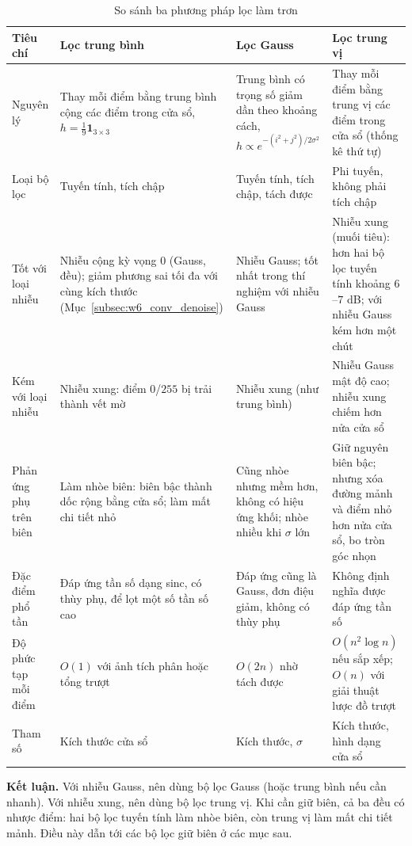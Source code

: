 \begin{table}[ht]
\centering
\scriptsize
\caption{So sánh ba phương pháp lọc làm trơn}
\label{tab:w6_three_filters}
\renewcommand{\arraystretch}{1.3}
\begin{tabularx}{\textwidth}{|p{2.2cm}|X|X|X|}
\hline
\textbf{Tiêu chí} & \textbf{Lọc trung bình} & \textbf{Lọc Gauss} & \textbf{Lọc trung vị} \\
\hline
Nguyên lý & Thay mỗi điểm bằng trung bình cộng các điểm trong cửa sổ, $h = \frac{1}{9}\mathbf{1}_{3 \times 3}$ & Trung bình có trọng số giảm dần theo khoảng cách, $h \propto e^{-(i^2 + j^2)/2\sigma^2}$ & Thay mỗi điểm bằng trung vị các điểm trong cửa sổ (thống kê thứ tự) \\
\hline
Loại bộ lọc & Tuyến tính, tích chập & Tuyến tính, tích chập, tách được & Phi tuyến, không phải tích chập \\
\hline
Tốt với loại nhiễu & Nhiễu cộng kỳ vọng $0$ (Gauss, đều); giảm phương sai tối đa với cùng kích thước (Mục~\ref{subsec:w6_conv_denoise}) & Nhiễu Gauss; tốt nhất trong thí nghiệm với nhiễu Gauss & Nhiễu xung (muối tiêu): hơn hai bộ lọc tuyến tính khoảng $6$--$7$ dB; với nhiễu Gauss kém hơn một chút \\
\hline
Kém với loại nhiễu & Nhiễu xung: điểm $0$/$255$ bị trải thành vết mờ & Nhiễu xung (như trung bình) & Nhiễu Gauss mật độ cao; nhiễu xung chiếm hơn nửa cửa sổ \\
\hline
Phản ứng phụ trên biên & Làm nhòe biên: biên bậc thành dốc rộng bằng cửa sổ; làm mất chi tiết nhỏ & Cũng nhòe nhưng mềm hơn, không có hiệu ứng khối; nhòe nhiều khi $\sigma$ lớn & Giữ nguyên biên bậc; nhưng xóa đường mảnh và điểm nhỏ hơn nửa cửa sổ, bo tròn góc nhọn \\
\hline
Đặc điểm phổ tần & Đáp ứng tần số dạng sinc, có thùy phụ, để lọt một số tần số cao & Đáp ứng cũng là Gauss, đơn điệu giảm, không có thùy phụ & Không định nghĩa được đáp ứng tần số \\
\hline
Độ phức tạp mỗi điểm & $O(1)$ với ảnh tích phân hoặc tổng trượt & $O(2n)$ nhờ tách được & $O(n^2 \log n)$ nếu sắp xếp; $O(n)$ với giải thuật lược đồ trượt \\
\hline
Tham số & Kích thước cửa sổ & Kích thước, $\sigma$ & Kích thước, hình dạng cửa sổ \\
\hline
\end{tabularx}
\end{table}

\textbf{Kết luận.} Với nhiễu Gauss, nên dùng bộ lọc Gauss (hoặc trung bình nếu cần nhanh). Với nhiễu xung, nên dùng bộ lọc trung vị. Khi cần giữ biên, cả ba đều có nhược điểm: hai bộ lọc tuyến tính làm nhòe biên, còn trung vị làm mất chi tiết mảnh. Điều này dẫn tới các bộ lọc giữ biên ở các mục sau.

